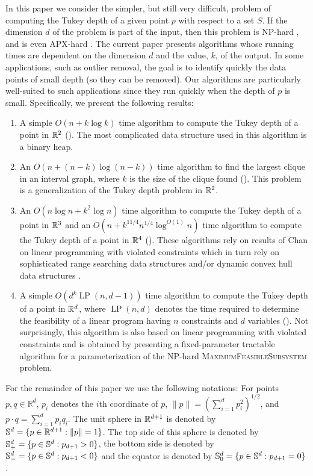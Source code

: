 \documentclass[charterfonts,lotsofwhite]{patmorin}
\DeclareMathOperator{\lp}{LP}
\begin{document}
In this paper we consider the simpler, but still very difficult,
problem of computing the Tukey depth of a given point $p$ with respect
to a set $S$. If the dimension $d$ of the problem is part of the
input, then this problem is NP-hard \cite{jp78}, and is even APX-hard
\cite{ak95}.  The current paper presents algorithms whose running
times are dependent on the dimension $d$ and the value, $k$, of the
output.  In some applications, such as outlier removal, the goal is to
identify quickly the data points of small depth (so they can be
removed).  Our algorithms are particularly well-suited to such
applications since they run quickly when the depth of $p$ is small.
Specifically, we present the following results:

\begin{enumerate}
\item A simple $O(n + k\log k)$ time algorithm to compute the Tukey
depth of a point in $\mathbb{R}^2$
().  The most complicated data structure used in this
algorithm is a binary heap.

\item An $O(n + (n-k)\log(n-k))$ time algorithm to find the largest
clique in an interval graph, where $k$ is the size of the clique found
().  This problem is a generalization of the Tukey
depth problem in $\mathbb{R}^2$.

\item An $O(n\log n + k^2\log n)$ time algorithm to compute the Tukey
depth of a point in $\mathbb{R}^3$ and an $O(n + k^{11/4}n^{1/4}\log^{O(1)}n)$
time algorithm to compute the Tukey depth of a point in $\mathbb{R}^4$
().  These algorithms rely on results of Chan on linear
programming with violated constraints \cite{c05} which in turn rely on
sophisticated range searching data structures \cite{m92,r99} and/or
dynamic convex hull data structures \cite{bj02}.

\item A simple $O(d^k \lp(n,d-1))$ time algorithm to compute the Tukey
depth of a point in $\mathbb{R}^d$, where $\lp(n,d)$ denotes the time required
to determine the feasibility of a linear program having $n$
constraints and $d$ variables ().  Not surprisingly, this
algorithm is also based on linear programming with violated
constraints and is obtained by presenting a fixed-parameter tractable
algorithm for a parameterization of the NP-hard
\textsc{MaximumFeasibleSubsystem} problem.
\end{enumerate}

For the remainder of this paper we use the following notations: For
points $p,q\in\mathbb{R}^d$, $p_i$ denotes the $i$th coordinate of
$p$, $\|p\|=(\sum_{i=1}^d p_i^2)^{1/2}$, and $p\cdot
q=\sum_{i=1}^d p_iq_i$.  The unit sphere in $\mathbb{R}^{d+1}$ is denoted by
$\mathbb{S}^d =\{ p\in\mathbb{R}^{d+1} : \|p\|=1\}$. The top side of this sphere is
denoted by $\mathbb{S}^d_+ =\{ p\in\mathbb{S}^{d} : p_{d+1} > 0 \}$, the bottom
side is denoted by $\mathbb{S}^d_- =\{ p\in\mathbb{S}^{d} : p_{d+1} < 0 \}$ and the
equator is denoted by $\mathbb{S}^d_0 =\{ p\in\mathbb{S}^{d} : p_{d+1} = 0 \}$ .
\end{document}
